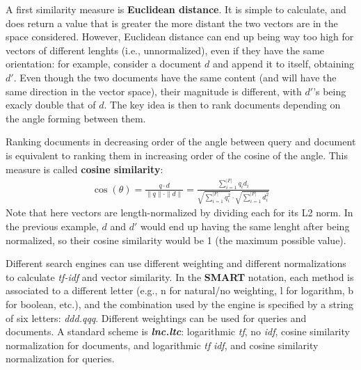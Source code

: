 A first similarity measure is \textbf{Euclidean distance}. It is simple to calculate, and does return a value that is greater the more distant the two vectors are in the space considered. However, Euclidean distance can end up being way too high for vectors of different lenghts (i.e., unnormalized), even if they have the same orientation: for example, consider a document $d$ and append it to itself, obtaining $d'$. Even though the two documents have the same content (and will have the same direction in the vector space), their magnitude is different, with $d'$'s being exacly double that of $d$. The key idea is then to rank documents depending on the angle forming between them.

Ranking documents in decreasing order of the angle between query and document is equivalent to ranking them in increasing order of the cosine of the angle. This measure is called \textbf{cosine similarity}:
\begin{gather*}
    \cos(\theta) = \frac{q \cdot d}{\|q\| \cdot \|d\|} = \frac{\sum_{i=1}^{|F|} q_i d_i}{\sqrt{\sum_{i=1}^{|F|} q_i^2} \cdot \sqrt{\sum_{i=1}^{|F|} d_i^2}}
\end{gather*}
Note that here vectors are length-normalized by dividing each for its L2 norm. In the previous example, $d$ and $d'$ would end up having the same lenght after being normalized, so their cosine similarity would be 1 (the maximum possible value).

Different search engines can use different weighting and different normalizations to calculate \textit{tf-idf} and vector similarity. In the \textbf{SMART} notation, each method is associated to a different letter (e.g., n for natural/no weighting, l for logarithm, b for boolean, etc.), and the combination used by the engine is specified by a string of six letters: \textit{ddd.qqq}. Different weightings can be used for queries and documents. A standard scheme is \textbf{\textit{lnc.ltc}}: logarithmic \textit{tf}, no \textit{idf}, cosine similarity normalization for documents, and logarithmic \textit{tf} \textit{idf}, and cosine similarity normalization for queries.
